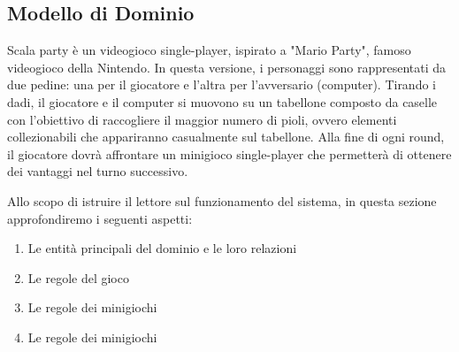 \subsection{Modello di Dominio}
Scala party è un videogioco single-player, ispirato a "Mario Party",
famoso videogioco della Nintendo. In questa versione, i personaggi 
sono rappresentati da due pedine: una per il giocatore e l'altra per
l'avversario (computer). Tirando i dadi, il giocatore e il computer 
si muovono su un tabellone composto da caselle con l'obiettivo di
raccogliere il maggior numero di pioli, ovvero elementi collezionabili
che appariranno casualmente sul tabellone. Alla fine di ogni round,
il giocatore dovrà affrontare un minigioco single-player che permetterà
di ottenere dei vantaggi nel turno successivo.


Allo scopo di istruire il lettore sul funzionamento del sistema,
in questa sezione approfondiremo i seguenti aspetti:
\begin{enumerate}
    \item Le entità principali del dominio e le loro relazioni
    \item Le regole del gioco
    \item Le regole dei minigiochi
    \item Le regole dei minigiochi
\end{enumerate}

